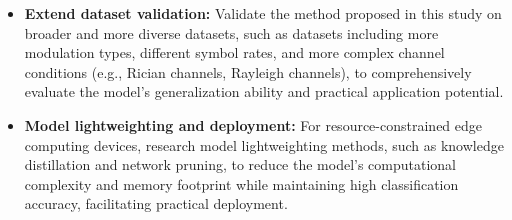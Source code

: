 \documentclass[conference]{IEEEtran}
\begin{document}
\begin{itemize}
\begin{itemize}
    \end{itemize}
    \item \textbf{Extend dataset validation:} Validate the method proposed in this study on broader and more diverse datasets, such as datasets including more modulation types, different symbol rates, and more complex channel conditions (e.g., Rician channels, Rayleigh channels), to comprehensively evaluate the model's generalization ability and practical application potential.
    \item \textbf{Model lightweighting and deployment:} For resource-constrained edge computing devices, research model lightweighting methods, such as knowledge distillation and network pruning, to reduce the model's computational complexity and memory footprint while maintaining high classification accuracy, facilitating practical deployment.
\end{itemize}


\printbibliography
\end{document}
